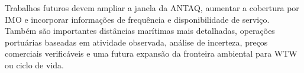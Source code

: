\documentclass[12pt,a4paper]{article}
\newcommand{\wtw}{WTW}
\begin{document}
Trabalhos futuros devem ampliar a janela da ANTAQ, aumentar a cobertura por IMO e incorporar informações de frequência e disponibilidade de serviço. Também são importantes distâncias marítimas mais detalhadas, operações portuárias baseadas em atividade observada, análise de incerteza, preços comerciais verificáveis e uma futura expansão da fronteira ambiental para \wtw{} ou ciclo de vida.

\clearpage

\printbibliography[title={Referências}]
\end{document}
